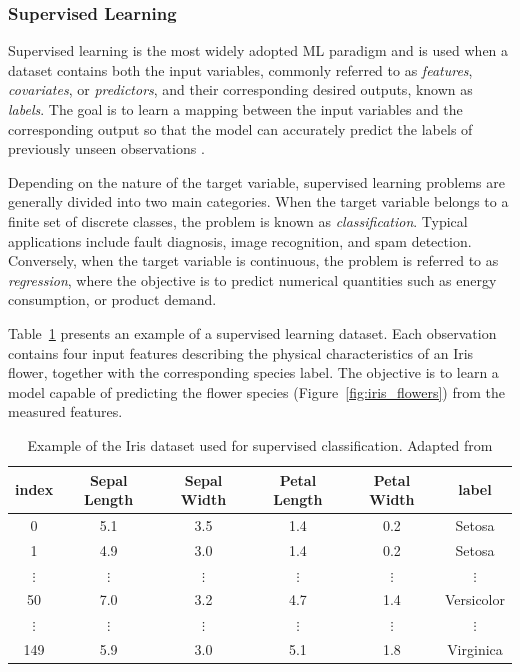 \subsubsection{Supervised Learning}

Supervised learning is the most widely adopted ML paradigm and is used when a dataset contains both the input variables, commonly referred to as \textit{features}, \textit{covariates}, or \textit{predictors}, and 
their corresponding desired outputs, known as \textit{labels}. The goal is to learn a mapping between the input variables and the corresponding output so that the model can accurately predict the labels of previously unseen 
observations \cite{Murphy2022}.

Depending on the nature of the target variable, supervised learning problems are generally divided into two main categories. When the target variable belongs to a finite set of discrete classes, the problem is known 
as \textit{classification}. Typical applications include fault diagnosis, image recognition, and spam detection. Conversely, when the target variable is continuous, the problem is referred to as \textit{regression}, where the 
objective is to predict numerical quantities such as energy consumption, or product demand.

Table~\ref{tab:supervised_dataset} presents an example of a supervised learning dataset. Each observation contains four input features describing the physical characteristics of an Iris flower, together with the corresponding 
species label. The objective is to learn a model capable of predicting the flower species (Figure~\ref{fig:iris_flowers}) from the measured features.

\begin{table}[htbp]
\centering
\caption{Example of the Iris dataset used for supervised classification. Adapted from \cite{Murphy2022}}
\label{tab:supervised_dataset}

\begin{tabular}{cccccc}
\toprule
\textbf{index} & \textbf{Sepal Length} & \textbf{Sepal Width} & \textbf{Petal Length} & \textbf{Petal Width} & \textbf{label} \\
\midrule
0   & 5.1 & 3.5 & 1.4 & 0.2 & Setosa \\
1   & 4.9 & 3.0 & 1.4 & 0.2 & Setosa \\
$\vdots$ & $\vdots$ & $\vdots$ & $\vdots$ & $\vdots$ & $\vdots$ \\
50  & 7.0 & 3.2 & 4.7 & 1.4 & Versicolor \\
$\vdots$ & $\vdots$ & $\vdots$ & $\vdots$ & $\vdots$ & $\vdots$ \\
149 & 5.9 & 3.0 & 5.1 & 1.8 & Virginica \\
\bottomrule
\end{tabular}

\end{table}


